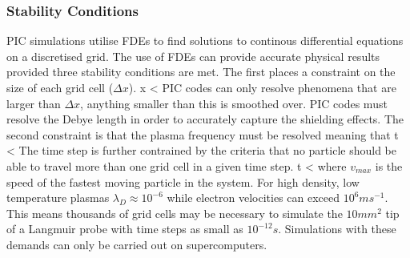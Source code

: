 \subsubsection{Stability Conditions}

PIC simulations utilise FDEs to find solutions to continous differential equations on a discretised grid. The use of FDEs can provide accurate physical results provided three stability conditions are met. The first places a constraint on the size of each grid cell ($\Delta x$). 
\be
\Delta x < 
\ee
PIC codes can only resolve phenomena that are larger than $\Delta x$, anything smaller than this is smoothed over. PIC codes must resolve the Debye length in order to accurately capture the shielding effects. The second constraint is that the plasma frequency must be resolved meaning that
\be
\Delta t < 
\ee
The time step is further contrained by the criteria that no particle should be able to travel more than one grid cell in a given time step. 
\be 
\Delta t < 
\ee
where $v_{max}$ is the speed of the fastest moving particle in the system. For high density, low temperature plasmas $\lambda_D \approx 10^{-6}$ while electron velocities can exceed $10^6 ms^{-1}$. This means thousands of grid cells may be necessary to simulate the $10mm^2$ tip of a Langmuir probe with time steps as small as $10^{-12}s$. Simulations with these demands can only be carried out on supercomputers.


